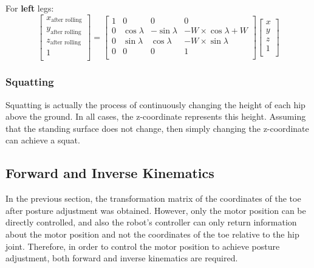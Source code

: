 For \textbf{left} legs:
\begin{equation}
   \begin{bmatrix}
   x_\text{after rolling} \\
   y_\text{after rolling} \\
   z_\text{after rolling} \\
   1                      \\
   \end{bmatrix}
   =
   \begin{bmatrix}
   1 & 0 & 0 & 0 \\
   0 & \cos\lambda & -\sin\lambda & -W \times \cos\lambda + W \\
   0 & \sin\lambda & \cos\lambda & -W \times \sin\lambda \\
   0 & 0 & 0 & 1 \\
   \end{bmatrix}
   \begin{bmatrix}
   x \\
   y \\
   z \\
   1 \\
   \end{bmatrix}
\end{equation}

\subsubsection{Squatting}

Squatting is actually the process of continuously changing the height of each hip above the ground. In all cases, the z-coordinate represents this height. Assuming that the standing surface does not change, then simply changing the z-coordinate can achieve a squat.

\subsection{Forward and Inverse Kinematics}

In the previous section, the transformation matrix of the coordinates of the toe after posture adjustment was obtained. However, only the motor position can be directly controlled, and also the robot's controller can only return information about the motor position and not the coordinates of the toe relative to the hip joint. Therefore, in order to control the motor position to achieve posture adjustment, both forward and inverse kinematics are required.

